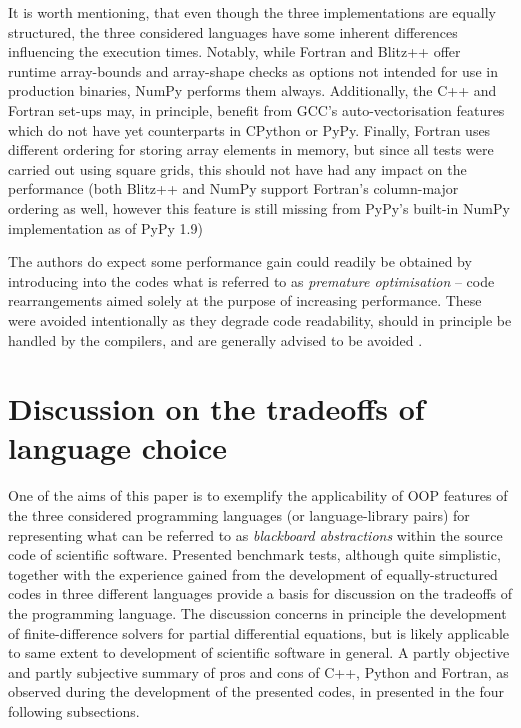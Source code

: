 \documentclass[final,5p,times,twocolumn]{elsarticle}
\begin{document}
  It is worth mentioning, that even though the three implementations are equally structured,
    the three considered languages have some inherent differences influencing the execution times.
  Notably, while Fortran and Blitz++ offer runtime array-bounds and array-shape checks as options
    not intended for use in production binaries, NumPy performs them always.
  Additionally, the C++ and Fortran set-ups may, in principle, benefit from GCC's auto-vectorisation
    features which do not have yet counterparts in CPython or PyPy.
  Finally, Fortran uses different ordering for storing array elements in memory, but since
    all tests were carried out using square grids, this should not have had any impact on the
    performance (both Blitz++ and NumPy support Fortran's column-major ordering as well, 
    however this feature is still missing from PyPy's built-in NumPy implementation as of PyPy 1.9)

  The authors do expect some performance gain could readily
    be obtained by introducing into the codes what is referred to as
    {\em premature optimisation} -- code rearrangements aimed solely
    at the purpose of increasing performance.
  These were avoided intentionally as they degrade code readability,
    should in principle be handled by the compilers,
    and are generally advised to be avoided \citep[e.g.][section 3.12]{bib_CERNcpp}.
 
  \section{Discussion on the tradeoffs of language choice}

  One of the aims of this paper is to exemplify the applicability of OOP features of the three considered
    programming languages (or language-library pairs) for representing
    what can be referred to as {\em blackboard abstractions} \citep{Rouson_et_al_2012} within the source code
    of scientific software.
  Presented benchmark tests, although quite simplistic, together with the experience gained 
    from the development of equally-structured codes in three different
    languages provide a basis for discussion on the tradeoffs of the programming language.
  The discussion concerns in principle the development of finite-difference solvers for 
    partial differential equations, but is likely applicable to same extent to
    development of scientific software in general.
  A partly objective and partly subjective summary of pros and cons of C++, Python and Fortran,
    as observed during the development of the presented codes, in presented in the four following subsections.
\end{document}
